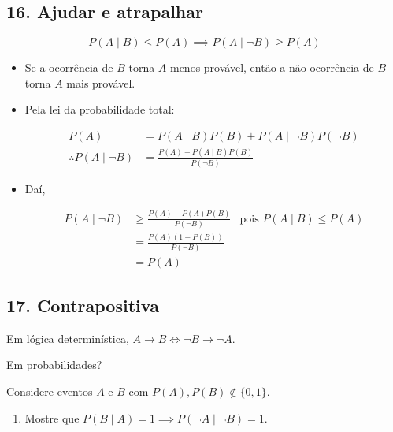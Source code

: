 \documentclass[
  11pt]{report}
\providecommand{\tightlist}{%
  \setlength{\itemsep}{0pt}\setlength{\parskip}{0pt}}
\begin{document}
\hypertarget{ajudar-e-atrapalhar}{%
\subsection*{16. Ajudar e atrapalhar}\label{ajudar-e-atrapalhar}}

\begin{rmdbox}
\[
P(A \mid B) \leq P(A) \implies P(A \mid \neg B) \geq P(A)
\]

\end{rmdbox}

\begin{itemize}
\item
  Se a ocorrência de $B$ torna $A$ menos provável, então a não-ocorrência de $B$ torna $A$ mais provável.
\item
  Pela lei da probabilidade total:

  \[
  \begin{aligned}
  P(A) &= P(A \mid B)P(B) + P(A \mid \neg B)P(\neg B) \\
  \therefore P(A \mid \neg B) &= 
    \frac{P(A) - P(A \mid B)P(B)}{P(\neg B)}
  \end{aligned}
  \]
\item
  Daí,

  \[
  \begin{aligned}
  P(A \mid \neg B) 
  &\geq
    \frac{P(A) - P(A)P(B)}{P(\neg B)} & \text{pois } P(A \mid B) \leq P(A) \\
  &= \frac{P(A)(1 - P(B))}{P(\neg B)} \\
  &= P(A)
  \end{aligned}
  \]
\end{itemize}

\hypertarget{contrapositiva}{%
\subsection*{17. Contrapositiva}\label{contrapositiva}}

\begin{rmdbox}

Em lógica determinística, $A \to B \iff \neg B \to \neg A$.

Em probabilidades?

Considere eventos $A$ e $B$ com $P(A), P(B) \not\in \{0, 1\}$.

\begin{enumerate}
\def\labelenumi{\alph{enumi}.}
\tightlist
\item
  Mostre que $P(B \mid A) = 1 \implies P(\neg A \mid \neg B) = 1$.
\end{enumerate}

\end{rmdbox}
\end{document}
